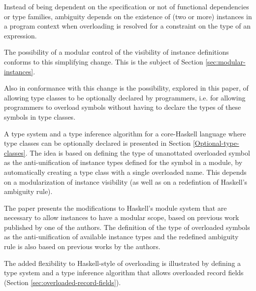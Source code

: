 Instead of being dependent on the specification or not of functional
dependencies or type families, ambiguity depends on the existence of
(two or more) instances in a program context when overloading is
resolved for a constraint on the type of an expression.

The possibility of a modular control of the visibility of instance
definitions conforms to this simplifying change. This is the subject
of Section \ref{sec:modular-instances}.

Also in conformance with this change is the possibility, explored in
this paper, of allowing type classes to be optionally declared by
programmers, i.e. for allowing programmers to overload symbols without
having to declare the types of these symbols in type classes. 

A type system and a type inference algorithm for a core-Haskell
language where type classes can be optionally declared is presented in
Section \ref{Optional-type-classes}.  The idea is based on defining
the type of unanottated overloaded symbol as the anti-unification of
instance types defined for the symbol in a module, by automatically
creating a type class with a single overloaded name. This depends on a
modularization of instance visibility (as well as on a redefintion of
Haskell's ambiguity rule). 

The paper presents the modifications to Haskell's module system that
are necessary to allow instances to have a modular scope, based on
previous work published by one of the authors. The definition of the
type of overloaded symbols as the anti-unification of available
instance types and the redefined ambiguity rule is also based on
previous works by the authors.

The added flexibility to Haskell-style of overloading is illustrated
by defining a type system and a type inference algorithm that allows
overloaded record fields (Section \ref{sec:overloaded-record-fields}).


